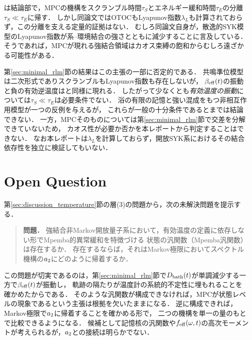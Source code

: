 \documentclass[a4paper,11pt,onecolumn,baselineskip=14.5pt]{jlreq}
\begin{document}
\cite{Wang2024}は結論部で，MPCの機構をスクランブル時間$\tau_S$とエネルギー緩和時間$\tau_E$の分離$\tau_S\ll\tau_E$に帰す．
しかし同論文ではOTOCもLyapunov指数$\lambda_L$も計算されておらず，この分離を支える定量的証拠はない．
むしろ同論文自身が，散逸的SYK模型のLyapunov指数が系--環境結合の強さとともに減少することに言及している\cite{Wang2024}．
そうであれば，MPCが現れる強結合領域はカオス束縛の飽和からむしろ遠ざかる可能性がある．

第\ref{sec:minimal_rlm}節の結果はこの主張の一部に否定的である．
共鳴準位模型は二次形式でありスクランブルもLyapunov指数も存在しないが，
$\beta_{\mathrm{eff}}(t)$の振動と負の有効逆温度は\cite{Wang2024}と同様に現れる．
したがって少なくとも\emph{有効温度の振動}については$\tau_S\ll\tau_E$は必要条件でない．
浴の有限の記憶と強い混成をもつ非相互作用模型が一つの反例を与えるが，
これらが一般の十分条件であるとまでは結論できない．
一方，MPCそのものについては第\ref{sec:minimal_rlm}節で交差を分解できていないため，
カオス性が必要か否かを本レポートから判定することはできない．
なお本レポートは$\lambda_L$を計算しておらず，開放SYK系におけるその結合依存性を独立に検証してもいない．

\section{Open Question}
\label{sec:open}

第\ref{sec:discussion_temperature}節の層(3)の問題から，次の未解決問題を提示する．

\begin{quote}
\textbf{問題．}
強結合非Markov開放量子系において，有効温度の定義に依存しない形でMpemba的異常緩和を特徴づける
状態の汎関数（Mpemba汎関数）は存在するか．
存在するならば，それはMarkov極限においてスペクトル機構の$a_{2}$にどのように帰着するか．
\end{quote}

この問題が切実であるのは，第\ref{sec:minimal_rlm}節で$D_{\mathrm{bath}}(t)$が単調減少する一方で$\beta_{\mathrm{eff}}(t)$が振動し，
軌跡の隔たりが温度計の系統的不定性に埋もれることを確かめたからである．
そのような汎関数が構成できなければ，MPCが状態レベルの現象であるという主張は根拠を欠いたままになる．
逆に構成できれば，Markov極限で$a_{2}$に帰着することを確かめる形で，
二つの機構を単一の量のもとで比較できるようになる．
候補として記憶核の汎関数や$f_{\mathrm{eff}}(\omega,t)$の高次モーメントが考えられるが，$a_{2}$との接続は明らかでない．
\end{document}
